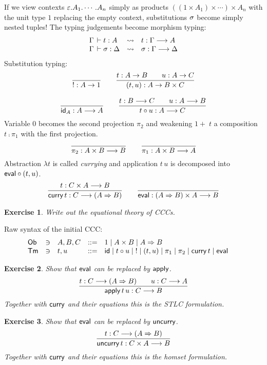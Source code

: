 \documentclass[a4paper,fleqn]{scrartcl}
\newtheorem{exercise}{Exercise}
\newcommand{\Tm}{\mathsf{Tm}}
\begin{document}
If we view contexts $\varepsilon.A_1.\cdots.A_n$ simply as products
$((1 \times A_1) \times \cdots) \times A_n$ with the unit type $1$
replacing the empty context, substitutions $\sigma$ become simply nested
tuples!  The typing judgements become morphism typing:
\[
\begin{array}{lcl}
  \Gamma \,\vdash t : A & \leadsto & t : \Gamma \longrightarrow A \\
  \Gamma \,\vdash \sigma : \Delta & \leadsto & \sigma : \Gamma \longrightarrow \Delta \\
\end{array}
\]
Substitution typing:
\begin{gather*}
  \dfrac{}{! : A \to 1}
\qquad
  \dfrac{t : A \to B \qquad u : A \to C
    }{(t,u) : A \to B \times C}
\\[2ex]
  \dfrac{}{\mathsf{id}_A : A \longrightarrow A}
\qquad
  \dfrac{t : B \longrightarrow C \qquad u : A \longrightarrow B}{t \circ u : A \longrightarrow C}
\end{gather*}
Variable $0$ becomes the second projection $\pi_2$ and weakening ${1+}\;t$ a composition $t \comp \pi_1$ with the first projection.
\[
  \dfrac{}{\pi_2 : A \times B \longrightarrow B}
\qquad
  \dfrac{}{\pi_1 : A \times B \longrightarrow A}
\]
Abstraction $\lambda t$ is called \emph{currying} and application $t\,u$ is decomposed into $\mathsf{eval} \circ (t,u)$.
\[
  \dfrac{t : C \times A \longrightarrow B}{\mathsf{curry}\,t : C \longrightarrow (A \Rightarrow B)}
\qquad
  \dfrac{}{\mathsf{eval} : (A \Rightarrow B) \times A \longrightarrow B}
\]
\begin{exercise}
Write out the equational theory of CCCs.
\end{exercise}


Raw syntax of the initial CCC:
\[
\begin{array}{lllrl@{\qquad}l}
\Ob & \ni & A,B,C & ::= & 1 \mid A \times B \mid A \To B \\
\Tm & \ni & t,u   & ::= & \tid \mid t \comp u \mid {!} \mid (t,u) \mid \pi_1 \mid \pi_2 \mid \tcurry\,t \mid \teval \\
\end{array}
\]

\begin{exercise}
Show that $\mathsf{eval}$ can be replaced by $\mathsf{apply}$.
\[
\dfrac{t : C \longrightarrow (A \Rightarrow B) \qquad u : C \longrightarrow A}{\mathsf{apply}\,t\,u : C \longrightarrow B}
\]
Together with $\mathsf{curry}$ and their equations this is the STLC formulation.
\end{exercise}
\begin{exercise}
Show that $\mathsf{eval}$ can be replaced by $\mathsf{uncurry}$.
\[
\dfrac{t : C \longrightarrow (A \Rightarrow B)}{\mathsf{uncurry}\,t : C \times A \longrightarrow B}
\]
Together with $\mathsf{curry}$ and their equations this is the homset formulation.
\end{exercise}
\end{document}
